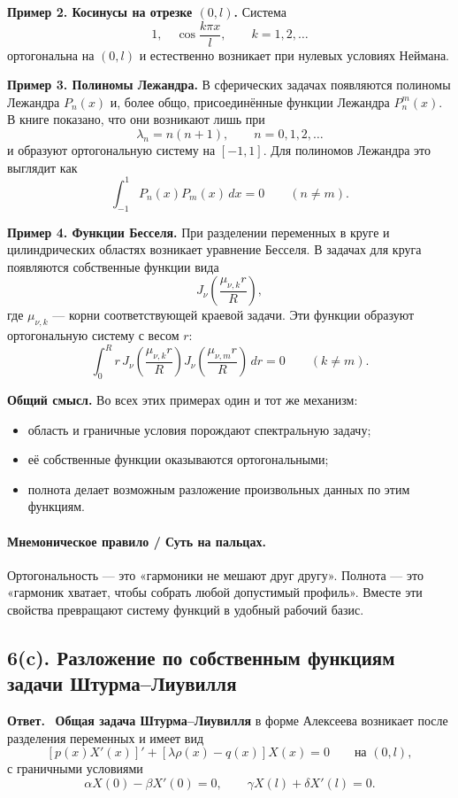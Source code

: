 \documentclass[a4paper,12pt]{article}
\newcommand{\Answer}{\textbf{Ответ.}\ }
\begin{document}
\textbf{Пример 2. Косинусы на отрезке \texorpdfstring{$(0,l)$}{(0,l)}.}
Система
\[
1,\quad \cos\frac{k\pi x}{l},
\qquad
k=1,2,\dots
\]
ортогональна на $(0,l)$ и естественно возникает при нулевых условиях Неймана.

\textbf{Пример 3. Полиномы Лежандра.}
В сферических задачах появляются полиномы Лежандра $P_n(x)$ и, более общо, присоединённые функции Лежандра $P_n^m(x)$. В книге показано, что они возникают лишь при
\[
\lambda_n=n(n+1),
\qquad
n=0,1,2,\dots
\]
и образуют ортогональную систему на $[-1,1]$. Для полиномов Лежандра это выглядит как
\[
\int_{-1}^1 P_n(x)P_m(x)\,dx=0
\qquad
(n\ne m).
\]

\textbf{Пример 4. Функции Бесселя.}
При разделении переменных в круге и цилиндрических областях возникает уравнение Бесселя. В задачах для круга появляются собственные функции вида
\[
J_\nu\!\left(\frac{\mu_{\nu,k}r}{R}\right),
\]
где $\mu_{\nu,k}$ --- корни соответствующей краевой задачи. Эти функции образуют ортогональную систему с весом $r$:
\[
\int_0^R
r\,
J_\nu\!\left(\frac{\mu_{\nu,k}r}{R}\right)
J_\nu\!\left(\frac{\mu_{\nu,m}r}{R}\right)\,dr=0
\qquad
(k\ne m).
\]

\textbf{Общий смысл.}
Во всех этих примерах один и тот же механизм:
\begin{itemize}
  \item область и граничные условия порождают спектральную задачу;
  \item её собственные функции оказываются ортогональными;
  \item полнота делает возможным разложение произвольных данных по этим функциям.
\end{itemize}

\paragraph{Мнемоническое правило / Суть на пальцах.}
Ортогональность --- это «гармоники не мешают друг другу». Полнота --- это «гармоник хватает, чтобы собрать любой допустимый профиль». Вместе эти свойства превращают систему функций в удобный рабочий базис.

\subsection*{6(c). Разложение по собственным функциям задачи Штурма--Лиувилля}

\Answer
\textbf{Общая задача Штурма--Лиувилля} в форме Алексеева возникает после разделения переменных и имеет вид
\[
[p(x)X'(x)]'+[\lambda \rho(x)-q(x)]X(x)=0
\qquad \text{на } (0,l),
\]
с граничными условиями
\[
\alpha X(0)-\beta X'(0)=0,
\qquad
\gamma X(l)+\delta X'(l)=0.
\]
\end{document}
